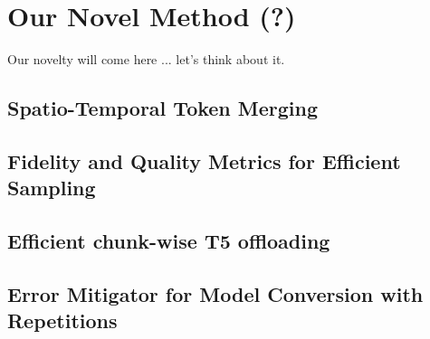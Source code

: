
\section{Our Novel Method (?)}

Our novelty will come here ... let's think about it.

\subsection{Spatio-Temporal Token Merging}

\subsection{Fidelity and Quality Metrics for Efficient Sampling}

\subsection{Efficient chunk-wise T5 offloading}

\subsection{Error Mitigator for Model Conversion with Repetitions}
